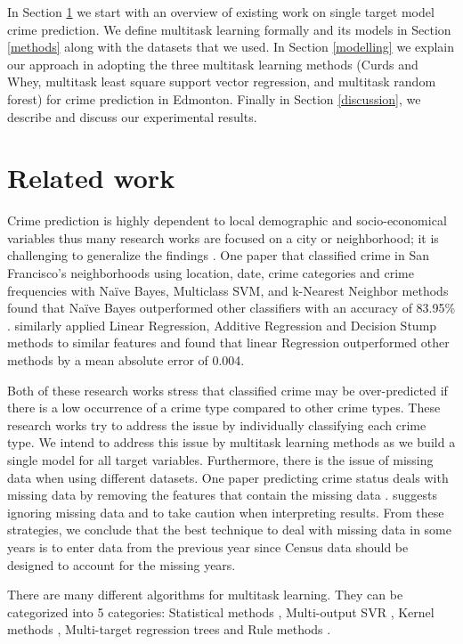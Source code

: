 \documentclass{article}
\begin{document}
In Section \ref{related} we start with an overview of existing work on single target model crime prediction. We define multitask learning formally and its models in Section \ref{methods} along with the datasets that we used. In Section \ref{modelling} we explain our approach in adopting the three multitask learning methods (Curds and Whey, multitask least square support vector regression, and multitask random forest) for crime prediction in Edmonton. Finally in Section \ref{discussion}, we describe and discuss our experimental results.

\section{Related work}
\label{related}

Crime prediction is highly dependent to local demographic and socio-economical variables thus many research works are focused on a city or neighborhood; it is challenging to generalize the findings \citep{nolan_establishing_2004}. One paper that classified crime in San Francisco’s neighborhoods using location, date, crime categories and crime frequencies with Naïve Bayes, Multiclass SVM, and k-Nearest Neighbor methods found that Naïve Bayes outperformed other classifiers with an accuracy of 83.95\% \citep{ke_san_2015}. \citet{mcclendon_using_2015} similarly applied Linear Regression, Additive Regression and Decision Stump methods \citep{sammut_decision_2011} to similar features and found that linear Regression outperformed other methods by a mean absolute error of 0.004.

Both of these research works stress that classified crime may be over-predicted if there is a low occurrence of a crime type compared to other crime types. These research works try to address the issue by individually classifying each crime type. We intend to address this issue by multitask learning methods as we build a single model for all target variables. Furthermore, there is the issue of missing data when using different datasets. One paper predicting crime status deals with missing data by removing the features that contain the missing data \citep{shojaee_study_2013}. \citet{nath_crime_2006} suggests ignoring missing data and to take caution when interpreting results. From these strategies, we conclude that the best technique to deal with missing data in some years is to enter data from the previous year since Census data should be designed to account for the missing years.

There are many different algorithms for multitask learning. They can be categorized into 5 categories: Statistical methods \citep{breiman_predicting_1997}, Multi-output SVR \citep{xu_multi-output_2013}, Kernel methods \citep{micchelli_kernels_2004}, Multi-target regression trees \citep{kocev_using_2009} and Rule methods \citep{aho_multi-target_2012}.
\end{document}
